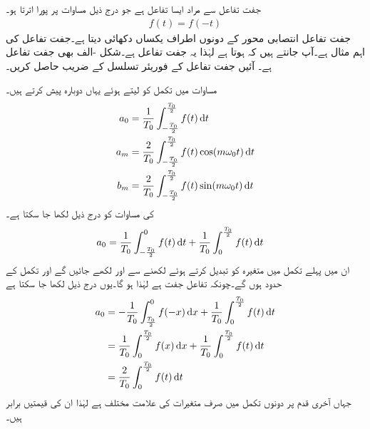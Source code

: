 جفت تفاعل سے مراد ایسا تفاعل ہے جو درج ذیل مساوات پر پورا اترتا ہو۔
\begin{align}
f(t)=f(-t)
\end{align}
جفت  تفاعل انتصابی  محور کے دونوں اطراف یکساں دکھائی دیتا ہے۔جفت تفاعل کی اہم مثال  ہے۔آپ جانتے ہیں کہ  ہوتا ہے لہٰذا یہ جفت تفاعل ہے۔شکل -الف بھی جفت تفاعل ہے۔ آئیں جفت تفاعل کے فوریئر تسلسل کے  ضریب  حاصل کریں۔

مساوات  میں تکمل کو  لیتے ہوئے یہاں دوبارہ پیش کرتے ہیں۔
\begin{gather}
\begin{aligned}\label{مساوات_فوریئر_عددی_سر_جفت}
a_0&=\frac{1}{T_0}\int_{-\frac{T_0}{2}}^{\frac{T_0}{2}}f(t) \dif t\\
a_m&=\frac{2}{T_0}\int_{-\frac{T_0}{2}}^{\frac{T_0}{2}}f(t) \cos (m \omega_0 t) \dif t\\
b_m&=\frac{2}{T_0}\int_{-\frac{T_0}{2}}^{\frac{T_0}{2}}f(t) \sin (m \omega_0 t) \dif t
\end{aligned}
\end{gather}
 کی مساوات کو درج ذیل لکھا جا سکتا ہے۔
\begin{align*}
a_0&=\frac{1}{T_0}\int_{-\frac{T_0}{2}}^0 f(t) \dif t+\frac{1}{T_0}\int_0^{\frac{T_0}{2}} f(t) \dif t
\end{align*}
ان میں پہلے تکمل میں متغیرہ کو تبدیل کرتے ہوئے  لکھنے سے  اور  لکھے جائیں گے اور تکمل کے حدود  ہوں گے۔چونکہ تفاعل جفت ہے لہٰذا  ہو گا۔یوں درج ذیل لکھا جا سکتا ہے
\begin{gather}
\begin{aligned}
a_0&=-\frac{1}{T_0}\int_{\frac{T_0}{2}}^0 f(-x) \dif x+\frac{1}{T_0}\int_0^{\frac{T_0}{2}} f(t) \dif t\\
&=\frac{1}{T_0}\int_0^{\frac{T_0}{2}} f(x) \dif x+\frac{1}{T_0}\int_0^{\frac{T_0}{2}} f(t) \dif t\\
&=\frac{2}{T_0}\int_0^{\frac{T_0}{2}} f(t) \dif t
\end{aligned}
\end{gather}
جہاں آخری قدم پر دونوں تکمل میں صرف متغیرات کی علامت مختلف ہے لہٰذا ان کی قیمتیں برابر ہیں۔

